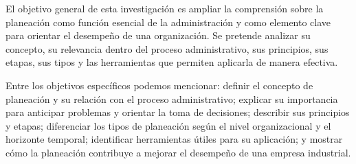 El objetivo general de esta investigación es ampliar la comprensión sobre la planeación como función esencial de la administración y como elemento clave para orientar el desempeño de una organización. Se pretende analizar su concepto, su relevancia dentro del proceso administrativo, sus principios, sus etapas, sus tipos y las herramientas que permiten aplicarla de manera efectiva.

Entre los objetivos específicos podemos mencionar: definir el concepto de planeación y su relación con el proceso administrativo; explicar su importancia para anticipar problemas y orientar la toma de decisiones; describir sus principios y etapas; diferenciar los tipos de planeación según el nivel organizacional y el horizonte temporal; identificar herramientas útiles para su aplicación; y mostrar cómo la planeación contribuye a mejorar el desempeño de una empresa industrial.